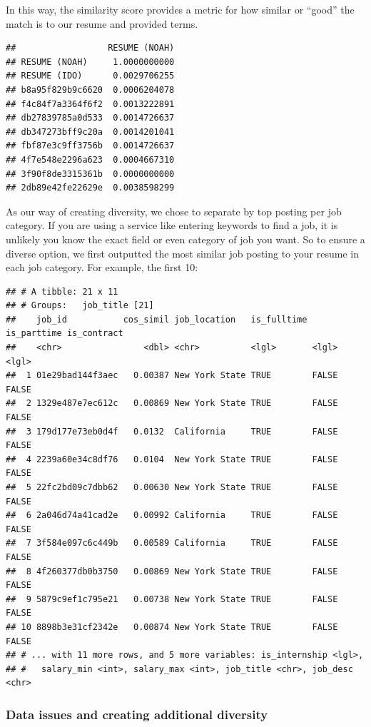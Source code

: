 \documentclass[
]{article}
\begin{document}
In this way, the similarity score provides a metric for how similar or
``good'' the match is to our resume and provided terms.

\begin{verbatim}
##                  RESUME (NOAH)
## RESUME (NOAH)     1.0000000000
## RESUME (IDO)      0.0029706255
## b8a95f829b9c6620  0.0006204078
## f4c84f7a3364f6f2  0.0013222891
## db27839785a0d533  0.0014726637
## db347273bff9c20a  0.0014201041
## fbf87e3c9ff3756b  0.0014726637
## 4f7e548e2296a623  0.0004667310
## 3f90f8de3315361b  0.0000000000
## 2db89e42fe22629e  0.0038598299
\end{verbatim}

As our way of creating diversity, we chose to separate by top posting
per job category. If you are using a service like entering keywords to
find a job, it is unlikely you know the exact field or even category of
job you want. So to ensure a diverse option, we first outputted the most
similar job posting to your resume in each job category. For example,
the first 10:

\begin{verbatim}
## # A tibble: 21 x 11
## # Groups:   job_title [21]
##    job_id           cos_simil job_location   is_fulltime is_parttime is_contract
##    <chr>                <dbl> <chr>          <lgl>       <lgl>       <lgl>      
##  1 01e29bad144f3aec   0.00387 New York State TRUE        FALSE       FALSE      
##  2 1329e487e7ec612c   0.00869 New York State TRUE        FALSE       FALSE      
##  3 179d177e73eb0d4f   0.0132  California     TRUE        FALSE       FALSE      
##  4 2239a60e34c8df76   0.0104  New York State TRUE        FALSE       FALSE      
##  5 22fc2bd09c7dbb62   0.00630 New York State TRUE        FALSE       FALSE      
##  6 2a046d74a41cad2e   0.00992 California     TRUE        FALSE       FALSE      
##  7 3f584e097c6c449b   0.00589 California     TRUE        FALSE       FALSE      
##  8 4f260377db0b3750   0.00869 New York State TRUE        FALSE       FALSE      
##  9 5879c9ef1c795e21   0.00738 New York State TRUE        FALSE       FALSE      
## 10 8898b3e31cf2342e   0.00874 New York State TRUE        FALSE       FALSE      
## # ... with 11 more rows, and 5 more variables: is_internship <lgl>,
## #   salary_min <int>, salary_max <int>, job_title <chr>, job_desc <chr>
\end{verbatim}

\hypertarget{data-issues-and-creating-additional-diversity}{%
\subsubsection{Data issues and creating additional
diversity}\label{data-issues-and-creating-additional-diversity}}
\end{document}
